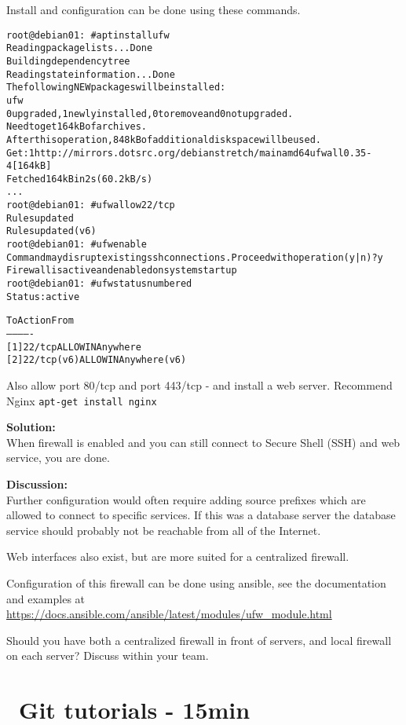 \documentclass[a4paper,11pt,notitlepage]{report}
\begin{document}
Install and configuration can be done using these commands.
\begin{alltt}
root@debian01:~# apt install ufw
Reading package lists... Done
Building dependency tree
Reading state information... Done
The following NEW packages will be installed:
  ufw
0 upgraded, 1 newly installed, 0 to remove and 0 not upgraded.
Need to get 164 kB of archives.
After this operation, 848 kB of additional disk space will be used.
Get:1 http://mirrors.dotsrc.org/debian stretch/main amd64 ufw all 0.35-4 [164 kB]
Fetched 164 kB in 2s (60.2 kB/s)
...
root@debian01:~# ufw allow 22/tcp
Rules updated
Rules updated (v6)
root@debian01:~# ufw enable
Command may disrupt existing ssh connections. Proceed with operation (y|n)? y
Firewall is active and enabled on system startup
root@debian01:~# ufw status numbered
Status: active

     To                         Action      From
     --                         ------      ----
[ 1] 22/tcp                     ALLOW IN    Anywhere
[ 2] 22/tcp (v6)                ALLOW IN    Anywhere (v6)
\end{alltt}

Also allow port 80/tcp and port 443/tcp - and install a web server. Recommend Nginx \verb+apt-get install nginx+

{\bf Solution:}\\
When firewall is enabled and you can still connect to Secure Shell (SSH) and web service, you are done.

{\bf Discussion:}\\
Further configuration would often require adding source prefixes which are allowed to connect to specific services. If this was a database server the database service should probably not be reachable from all of the Internet.

Web interfaces also exist, but are more suited for a centralized firewall.

Configuration of this firewall can be done using ansible, see the documentation and examples at \url{https://docs.ansible.com/ansible/latest/modules/ufw_module.html}

Should you have both a centralized firewall in front of servers, and local firewall on each server? Discuss within your team.



\chapter{\faExclamationTriangle\ Git tutorials - 15min}
\label{ex:git-tutorial}
\end{document}
